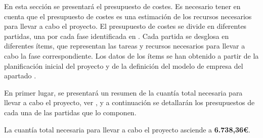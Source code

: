 En esta sección se presentará el presupuesto de costes.
Es necesario tener en cuenta que el presupuesto de costes es una estimación de los recursos necesarios para llevar a cabo el proyecto.
El presupuesto de costes se divide en diferentes partidas, una por cada fase identificada en .
Cada partida se desglosa en diferentes ítems, que representan las tareas y recursos necesarios para llevar a cabo la fase correspondiente.
Los datos de los ítems se han obtenido a partir de la planificación inicial del proyecto y de la definición del modelo de empresa del apartado .

En primer lugar, se presentará un resumen de la cuantía total necesaria para llevar a cabo el proyecto, ver 
, y a continuación se detallarán los presupuestos de cada una de las partidas que lo componen.

La cuantía total necesaria para llevar a cabo el proyecto asciende a \textbf{6.738,36€}. 


